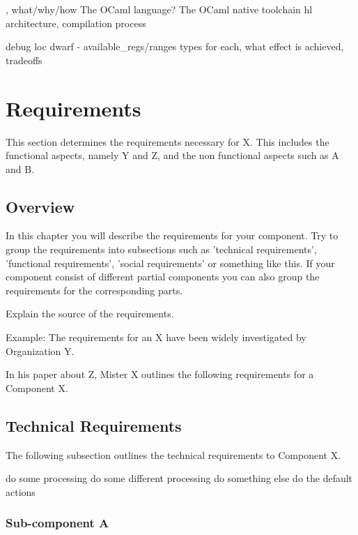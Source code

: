 , what/why/how
The OCaml language?
The OCaml native toolchain
hl architecture, compilation process

debug loc
dwarf - available\_regs/ranges
types
for each, what effect is achieved, tradeoffs


\chapter{Requirements\label{cha:chapter3}}
This section determines the requirements necessary for X. This includes the functional aspects, namely Y and Z, and the non functional aspects such as A and B.

\section{Overview\label{sec:reqoverview}}

In this chapter you will describe the requirements for your component. Try to group the requirements into subsections such as 'technical requirements', 'functional requirements', 'social requirements' or something like this. If your component consist of different partial components you can also group the requirements for the corresponding parts.

Explain the source of the requirements.

Example: The requirements for an X have been widely investigated by Organization Y.

In his paper about Z, Mister X outlines the following requirements for a Component X.

\section{Technical Requirements\label{sec:techreq}}

The following subsection outlines the technical requirements to Component X.

\begin{algorithmic}[1]
	\State do some processing
	\State do some different processing
	\State do something else
	\Else
	\State do the default actions
	\EndIf
\end{algorithmic}

\subsection{Sub-component A\label{sec:reqsuba}}

